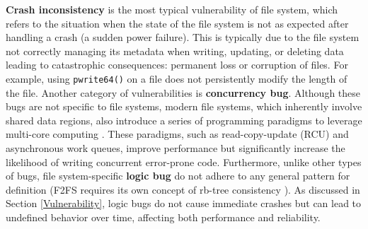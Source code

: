 \textbf{Crash inconsistency} is the most typical vulnerability of file system, which refers to the situation when the state of the file system is not as expected after handling a crash (\eg a sudden power failure). This is typically due to the file system not correctly managing its metadata when writing, updating, or deleting data leading to catastrophic consequences: permanent loss or corruption of files. For example, using \texttt{pwrite64()} on a file does not persistently modify the length of the file.  Another category of vulnerabilities is \textbf{concurrency bug}. Although these bugs are not specific to file systems, modern file systems, which inherently involve shared data regions, also introduce a series of programming paradigms to leverage multi-core computing \cite{fstests}. These paradigms, such as read-copy-update (RCU) and asynchronous work queues, improve performance but significantly increase the likelihood of writing concurrent error-prone code. Furthermore, unlike other types of bugs, file system-specific \textbf{logic bug} do not adhere to any general pattern for definition (\eg F2FS requires its own concept of rb-tree consistency \cite{Hydra2020finding}). As discussed in Section \ref{Vulnerability}, logic bugs do not cause immediate crashes but can lead to undefined behavior over time, affecting both performance and reliability.

